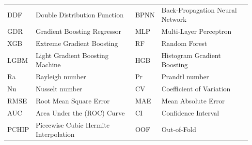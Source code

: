 \documentclass[12pt]{article}
\begin{document}
\begin{table}[!ht]
\begin{tabular}{llll}
DDF & Double Distribution Function & BPNN & Back-Propagation Neural Network \\
GDR & Gradient Boosting Regressor & MLP & Multi-Layer Perceptron \\
XGB & Extreme Gradient Boosting & RF & Random Forest \\
LGBM & Light Gradient Boosting Machine & HGB & Histogram Gradient Boosting \\
Ra & Rayleigh number & Pr & Prandtl number \\
Nu & Nusselt number & CV & Coefficient of Variation \\
RMSE & Root Mean Square Error & MAE & Mean Absolute Error \\
AUC & Area Under the (ROC) Curve & CI & Confidence Interval \\
PCHIP & Piecewise Cubic Hermite Interpolation & OOF & Out-of-Fold \\
\bottomrule
\end{tabular}
\end{table}
\end{document}
